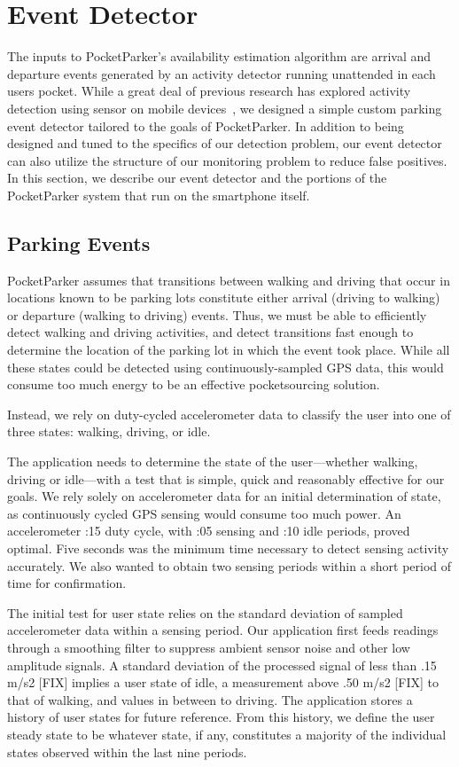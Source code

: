 \section{Event Detector}
\label{sec-detector}

The inputs to PocketParker's availability estimation algorithm are arrival
and departure events generated by an activity detector running unattended in
each users pocket. While a great deal of previous research has explored
activity detection using sensor on mobile devices~\cite{FIXME}, we designed a
simple custom parking event detector tailored to the goals of PocketParker.
In addition to being designed and tuned to the specifics of our detection
problem, our event detector can also utilize the structure of our monitoring
problem to reduce false positives. In this section, we describe our event
detector and the portions of the PocketParker system that run on the
smartphone itself.

\subsection{Parking Events}
\label{subsec-goals}

PocketParker assumes that transitions between walking and driving that occur
in locations known to be parking lots constitute either arrival (driving to
walking) or departure (walking to driving) events. Thus, we must be able to
efficiently detect walking and driving activities, and detect transitions
fast enough to determine the location of the parking lot in which the event
took place. While all these states could be detected using
continuously-sampled GPS data, this would consume too much energy to be an
effective pocketsourcing solution.

Instead, we rely on duty-cycled accelerometer data to classify the user into
one of three states: walking, driving, or idle.

The application needs to determine the state of the user---whether walking,
driving or idle---with a test that is simple, quick and reasonably effective
for our goals. We rely solely on accelerometer data for an initial
determination of state, as continuously cycled GPS sensing would consume too
much power. An accelerometer :15 duty cycle, with :05 sensing and :10 idle
periods, proved optimal. Five seconds was the minimum time necessary to
detect sensing activity accurately. We also wanted to obtain two sensing
periods within a short period of time for confirmation.

The initial test for user state relies on the standard deviation of sampled
accelerometer data within a sensing period.  Our application first feeds
readings through a smoothing filter to suppress ambient sensor noise
and other low amplitude signals.  A standard deviation of the processed
signal of less than .15 m/s2 [FIX] implies a user state of idle, a measurement
above .50 m/s2 [FIX] to that of walking, and values in between to driving. The
application stores a history of user states for future reference. From this
history, we define the user steady state to be whatever state, if any,
constitutes a majority of the individual states observed within the last
nine periods.

